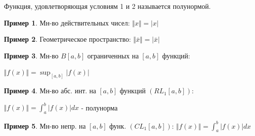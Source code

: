 \documentclass{article}
\theoremstyle{definition}
\numberwithin{theorem}{section}
\numberwithin{lemma}{section}
\numberwithin{definition}{section}
\numberwithin{corollary}{section}
\newtheorem*{eg}{Пример}
\numberwithin{equation}{section}
\begin{document}
\begin{definition}
  Функция, удовлетворяющая условиям 1 и 2 называется полунормой.
\end{definition}
\begin{eg}
  Мн-во действительных чисел: $\Vert x \Vert=|x|$
\end{eg}
\begin{eg}
  Геометрическое пространство: $\Vert \bar{x} \Vert=|\bar{x}|$
\end{eg}
\begin{eg}
  Мн-во $B[a,b]$ ограниченных на $[a,b]$ функций: 

  $\Vert f(x) \Vert=\sup_{[a,b]}|f(x)|$
\end{eg}
\begin{eg}
  Мн-во абс. инт. на $[a,b]$ функций $(RL_1[a,b])$: 

  $\Vert f(x) \Vert=\int_{a}^{b}|f(x)|dx$ - полунорма
\end{eg}
\begin{eg}
  Мн-во непр. на $[a,b]$ функ. $(CL_1[a,b])$: $\Vert f(x) \Vert=\int_{a}^{b}|f(x)|dx$
\end{eg}
\end{document}
